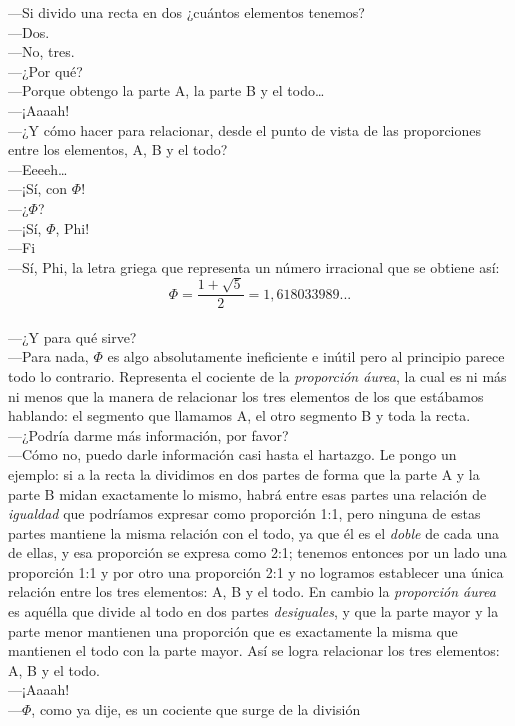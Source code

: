 ---Si divido una recta en dos ¿cuántos elementos tenemos?\\
---Dos.\\
---No, tres.\\
---¿Por qué?\\
---Porque obtengo la parte A, la parte B y el todo\ldots\\
---¡Aaaah!\\
---¿Y cómo hacer para relacionar, desde el punto de vista de las proporciones
entre los elementos, A, B y el todo?\\
---Eeeeh\ldots\\
---¡Sí, con $\Phi$!\\
---¿$\Phi$?\\
---¡Sí, $\Phi$, Phi!\\
---Fi\\
---Sí, Phi, la letra griega que representa un número irracional que se obtiene así: $$\Phi=\frac{1+\sqrt{5}}{2}=1,618033989...$$\\
---¿Y para qué sirve?\\
---Para nada, $\Phi$ es algo absolutamente ineficiente e inútil pero al principio parece todo lo contrario. Representa el cociente de la \emph{proporción áurea}, la cual es ni más ni menos que la manera de relacionar los tres elementos de los que estábamos hablando: el segmento que llamamos A, el otro segmento B y toda la recta.\\
---¿Podría darme más información, por favor?\\
---Cómo no, puedo darle información casi hasta el hartazgo. Le pongo un ejemplo: si a la recta la dividimos en dos partes de forma que la parte A y la parte B midan exactamente lo mismo, habrá entre esas partes una relación de \emph{igualdad} que podríamos expresar como proporción 1:1, pero ninguna de estas partes mantiene la misma relación con el todo, ya que él es el \emph{doble} de cada una de ellas, y esa proporción se expresa como 2:1; tenemos entonces por un lado una proporción 1:1 y por otro una proporción 2:1 y no logramos establecer una única relación entre los tres elementos: A, B y el todo. En cambio la \emph{proporción áurea} es aquélla que divide al todo en dos partes \emph{desiguales}, y que la parte mayor y la parte menor mantienen una proporción que es exactamente la misma que mantienen el todo con la parte mayor. Así se logra relacionar los tres elementos: A, B y el todo.\\
---¡Aaaah!\\
---$\Phi$, como ya dije, es un cociente que surge de la división
